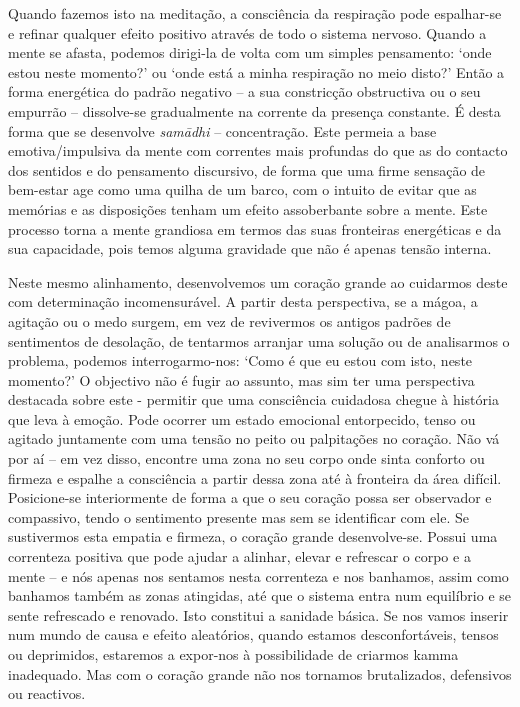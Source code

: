 Quando fazemos isto na meditação, a consciência da respiração pode espalhar-se e
refinar qualquer efeito positivo através de todo o sistema nervoso. Quando a
mente se afasta, podemos dirigi-la de volta com um simples pensamento: `onde
estou neste momento?' ou `onde está a minha respiração no meio disto?' Então a
forma energética do padrão negativo -- a sua constricção obstructiva ou o seu
empurrão -- dissolve-se gradualmente na corrente da presença constante. É desta
forma que se desenvolve \emph{samādhi} -- concentração. Este permeia a base
emotiva/impulsiva da mente com correntes mais profundas do que as do contacto
dos sentidos e do pensamento discursivo, de forma que uma firme sensação de
bem-estar age como uma quilha de um barco, com o intuito de evitar que as
memórias e as disposições tenham um efeito assoberbante sobre a mente. Este
processo torna a mente grandiosa em termos das suas fronteiras energéticas e da
sua capacidade, pois temos alguma gravidade que não é apenas tensão interna.

Neste mesmo alinhamento, desenvolvemos um coração grande ao cuidarmos deste com
determinação incomensurável. A partir desta perspectiva, se a mágoa, a agitação
ou o medo surgem, em vez de revivermos os antigos padrões de sentimentos de
desolação, de tentarmos arranjar uma solução ou de analisarmos o problema,
podemos interrogarmo-nos: `Como é que eu estou com isto, neste momento?' O
objectivo não é fugir ao assunto, mas sim ter uma perspectiva destacada sobre
este - permitir que uma consciência cuidadosa chegue à história que leva à
emoção. Pode ocorrer um estado emocional entorpecido, tenso ou agitado
juntamente com uma tensão no peito ou palpitações no coração. Não vá por aí --
em vez disso, encontre uma zona no seu corpo onde sinta conforto ou firmeza e
espalhe a consciência a partir dessa zona até à fronteira da área difícil.
Posicione-se interiormente de forma a que o seu coração possa ser observador e
compassivo, tendo o sentimento presente mas sem se identificar com ele. Se
sustivermos esta empatia e firmeza, o coração grande desenvolve-se. Possui uma
correnteza positiva que pode ajudar a alinhar, elevar e refrescar o corpo e a
mente -- e nós apenas nos sentamos nesta correnteza e nos banhamos, assim como
banhamos também as zonas atingidas, até que o sistema entra num equilíbrio e se
sente refrescado e renovado. Isto constitui a sanidade básica. Se nos vamos
inserir num mundo de causa e efeito aleatórios, quando estamos desconfortáveis,
tensos ou deprimidos, estaremos a expor-nos à possibilidade de criarmos kamma
inadequado. Mas com o coração grande não nos tornamos brutalizados, defensivos
ou reactivos.

